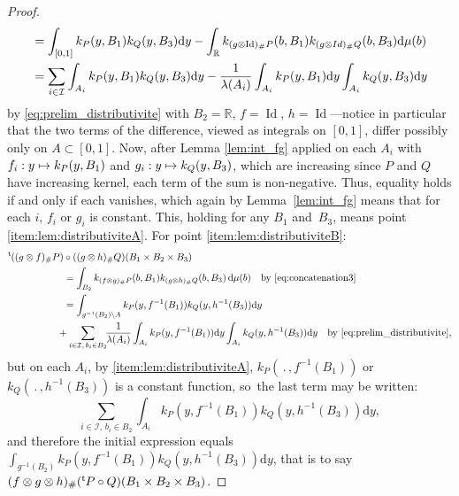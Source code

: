 \documentclass[10pt,a4paper]{article}
\newcommand\mto{\mathchoice{\longmapsto}{\mapsto}{\mapsto}{\mapsto}}
\theoremstyle{plain}
\theoremstyle{definition}
\newcommand{\dd}{\mathrm{d}}
\newcommand{\Id}{\operatorname{Id}}
\newcommand{\trans}{{}^{\mathrm{t}}\mkern-1mu}
\newcommand{\la}{\lambda}
\newcommand{\R}{\mathbb{R}}
\begin{document}
\begin{proof}
\begin{align*}
&=\int_{[0,1]}k_{P}(y,B_1)k_Q(y,B_3)\dd y-\int_{\R}k_{(g\otimes \Id)_\#P}(b,B_1)k_{(g \otimes {\rm Id})_\#Q}(b,B_3)\dd\mu(b)\\
&=\sum_{i\in\mathcal{I}}\int_{A_i}k_{P}(y,B_1)k_{Q}(y,B_3)\dd y-\frac1{\la(A_i)}\int_{A_i}k_{P}(y,B_1)\dd y\int_{A_i}k_{Q}(y,B_3)\dd y
\end{align*}
by \eqref{eq:prelim_distributivite} with $B_2=\R$, $f=\Id$, $h=\Id$---notice in particular that the two terms of the difference, viewed as integrals on $[0,1]$, differ possibly only on $A\subset[0,1]$. Now, after Lemma \ref{lem:int_fg} applied on each $A_i$ with $f_i:y\mto k_{P}(y,B_1)$ and $g_i:y\mto k_{Q}(y,B_3)$, which are increasing since $P$ and $Q$ have increasing kernel, each term of the sum is non-negative. Thus, equality holds if and only if each vanishes, which again by Lemma~\ref{lem:int_fg} means that for each $i$, $f_i$ or $g_i$ is constant. This, holding for any $B_1$ and~$B_3$, means point \eqref{item:lem:distributiviteA}. For point \eqref{item:lem:distributiviteB}:\vspace*{-3pt}
\begin{align*}
\trans((g\otimes f)_\# P)&\circ ((g \otimes h)_\#Q)(B_1\times B_2\times B_3)\\
&=\int_{B_2} k_{(f\otimes g)_\#P}(b,B_1)k_{(g\otimes h)_\#Q}(b,B_3)\,\dd \mu(b)\quad\text{by \eqref{eq:concatenation3}}\\
&=\int_{g^{-1}(B_2)\setminus A} k_{P}(y,f^{-1}(B_1))k_{Q}(y,h^{-1}(B_3))\dd y\\
&\!\!\!\!+\sum_{i\in \mathcal{I},\,b_i\in B_2}\!\!\frac1{\la(A_i)}\int_{A_i}k_{P}(y,f^{-1}(B_1))\dd y\int_{A_i}k_{Q}(y,h^{-1}(B_3))\dd y\quad\text{by \eqref{eq:prelim_distributivite},}
\end{align*}
but on each $A_i$, by \eqref{item:lem:distributiviteA}, $k_{P}(\,.\,,f^{-1}(B_1))$ or $k_{Q}(\,.\,,h^{-1}(B_3))$ is a constant function, so~the last term may be written:\vspace*{-3pt}
\[\sum_{i\in \mathcal{I},\,b_i\in B_2}\!\int_{A_i}k_{P}(y,f^{-1}(B_1))k_{Q}(y,h^{-1}(B_3))\dd y,\]
and therefore the initial expression equals $\int_{g^{-1}(B_2)} k_{P}(y,f^{-1}(B_1))k_{Q}(y,h^{-1}(B_3))\dd y$, that is to say $(f\otimes g \otimes h)_\#(\trans P\circ Q)(B_1\times B_2\times B_3)$.
\end{proof}
\end{document}
